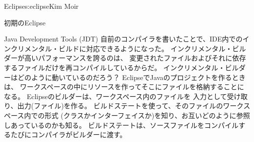 \begin{aosachapter}{Eclipse}{s:eclipse}{Kim Moir}
\begin{aosasect1}{初期のEclipse}
\begin{aosasect2}{Java Development Tools (JDT)}
自前のコンパイラを書いたことで、IDE内でのインクリメンタル・ビルドに対応できるようになった。
インクリメンタル・ビルダーが高いパフォーマンスを誇るのは、
変更されたファイルおよびそれに依存するファイルだけを再コンパイルしているからだ。
インクリメンタル・ビルダーはどのように動いているのだろう？
EclipseでJavaのプロジェクトを作るときは、
ワークスペースの中にリソースを作ってそこにファイルを格納することになる。
Eclipseのビルダーは、ワークスペース内のファイルを
入力として受け取り、出力(ファイル)を作る。
ビルドステートを使って、そのファイルのワークスペース内での形式
(クラスかインターフェイスか)を知り、お互いどのように参照しあっているのかも知る。
ビルドステートは、ソースファイルをコンパイルするたびにコンパイラがビルダーに渡す。

\end{aosasect2}
\end{aosasect1}
\end{aosachapter}
